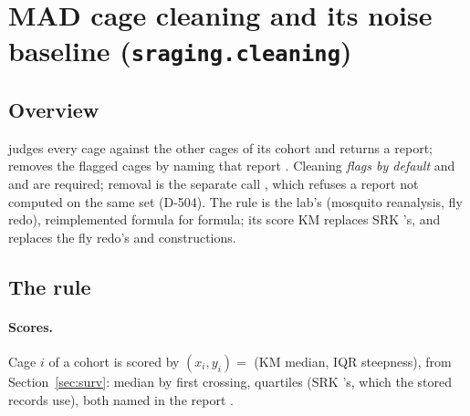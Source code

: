 \section{MAD cage cleaning and its noise baseline (\texttt{sraging.cleaning})}\label{sec:clean}

\subsection{Overview}\label{sec:clean-overview}

 judges every cage against the other cages of its cohort and returns a report;  removes the
flagged cages by naming that report . Cleaning \emph{flags by default} and  and
 are required; removal is the separate call , which refuses a report not computed on the same
set (D-504). The rule is the lab's  (mosquito reanalysis, fly redo), reimplemented
formula for formula; its score KM replaces SRK 's, and  replaces the fly redo's
 and  constructions.

\subsection{The rule}\label{sec:clean-rule}

\paragraph{Scores.} Cage $i$ of a cohort is scored by $(x_i,y_i)=$ (KM median, IQR steepness), from
Section~\ref{sec:surv}: median by first crossing, quartiles  (SRK 's, which the stored
records use), both named in the report .

